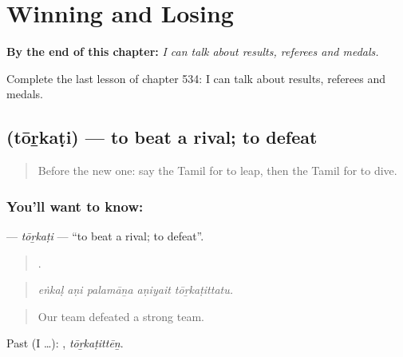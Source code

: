 
\chapter{Winning and Losing}
\label{ch:ta-winning-and-losing}

\begin{chapteropening}
\textbf{By the end of this chapter:} \emph{I can talk about results, referees and medals.}

Complete the last lesson of chapter 534: I can talk about results, referees and medals.
\end{chapteropening}

\section[\texorpdfstring{\ta{தோற்கடி} (tōṟkaṭi)}{தோற்கடி (tōṟkaṭi)}]{ (tōṟkaṭi) — to beat a rival; to defeat}

\label{lesson:TA-C534-torkati}



\begin{quote}
Before the new one: say the Tamil for to leap, then the Tamil for to dive.
\end{quote}

\subsection*{You'll want to know: }
\textbf{} — \emph{tōṟkaṭi} — \textquotedblleft{}to beat a rival; to defeat\textquotedblright{}.

\begin{quote}
    .
\end{quote}

\begin{quote}
\emph{eṅkaḷ aṇi palamāṉa aṇiyait tōṟkaṭittatu.}
\end{quote}

\begin{quote}
Our team defeated a strong team.
\end{quote}

Past (I …): , \emph{tōṟkaṭittēṉ}.

